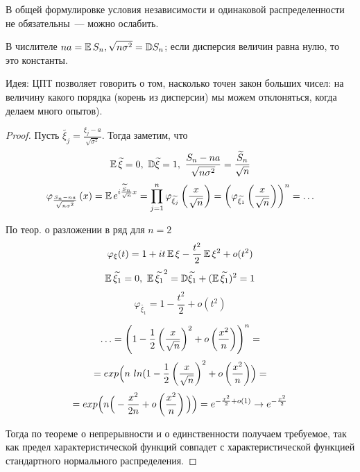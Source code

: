\begin{lemmanote} 

В общей формулировке условия независимости и одинаковой распределенности не обязательны~--- можно ослабить.

\end{lemmanote}

\begin{lemmanote} 

В числителе $na =\operatorname{\mathbb{E}} S_n, \sqrt{n\sigma^2} = {\mathbb{D}} S_n$; если дисперсия величин равна нулю, то это константы.

\end{lemmanote}

\begin{lemmanote} 

Идея: ЦПТ позволяет говорить о том, насколько точен закон больших чисел: на величину какого порядка (корень из дисперсии) мы можем отклоняться, когда делаем много опытов).

\end{lemmanote}

\begin{proof} Пусть $\widetilde{\xi_j} = \frac{\xi_j - a}{\sqrt{\sigma^2}}$. 
Тогда заметим, что $$\E\widetilde{\xi} = 0, \ \D\widetilde{\xi} = 1, \ \frac{S_n - na}{\sqrt{n\sigma^2}} = \frac{\widetilde{S}_n}{\sqrt{n}}$$
$$
    \varphi_{\frac{S_n - na}{\sqrt{n\sigma^2}}}\left({x}\right) = \operatorname{\mathbb{E}} e^{i \frac{\widetilde{S}_n}{\sqrt{n}} x} = \prod\limits_{j = 1}^n \varphi_{\widetilde{\xi_j}}\left({\frac{x}{\sqrt{n}}}\right) = \left({\varphi_{\widetilde{\xi_1}}\left({\frac{x}{\sqrt{n}}}\right)}\right)^n = \ldots$$
    
По теор. о разложении в ряд для $n=2$ 
$$\varphi_\xi(t) = 1+it\operatorname{\mathbb{E}}\xi - \frac{t^2}{2}\operatorname{\mathbb{E}}\xi^2 + o(t^2)$$
$$\operatorname{\mathbb{E}}\widetilde{\xi_1}=0,\ \operatorname{\mathbb{E}}\widetilde{\xi_1}^2 = {\mathbb{D}}\widetilde{\xi_1} + (\operatorname{\mathbb{E}}\widetilde{\xi_1})^2 = 1$$
$$\varphi_{\widetilde{\xi_1}} = 1 - \frac{t^2}{2} + o(t^2)$$

$$\ldots= \left({1 - \frac{1}{2}\left({\frac{x}{\sqrt{n}}}\right)^2 + o\left({\frac{x^2}{n}}\right)}\right)^n =$$ 
$$ = exp\Big(n \ ln({1 - \frac{1}{2}\left({\frac{x}{\sqrt{n}}}\right)^2 + o\left({\frac{x^2}{n}}\right)}\Big) = $$
$$= exp\Big(n \Big(-\frac{x^2}{2n} + o\left({\frac{x^2}{n}}\right)\Big) \Big) = e^{-\frac{x^2}{2} + o(1)} \to e^{-\frac{x^2}{2}}
$$

Тогда по теореме о непрерывности и о единственности получаем требуемое, так как предел характеристической функций совпадет с характеристической функцией стандартного нормального распределения. \end{proof}